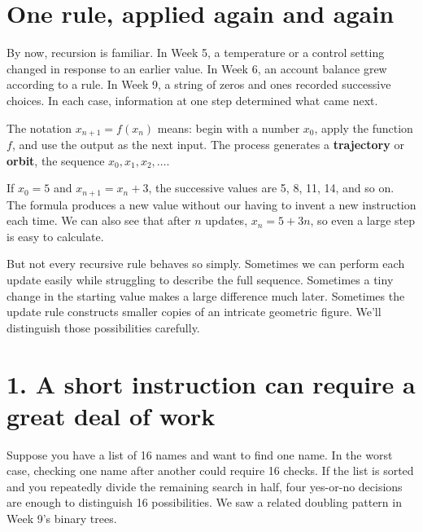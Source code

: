 \documentclass[11pt,letterpaper]{article}
\begin{document}
\section{One rule, applied again and again}


By now, recursion is familiar. In Week 5, a temperature or a control setting changed in response to an earlier value. In Week 6, an account balance grew according to a rule. In Week 9, a string of zeros and ones recorded successive choices. In each case, information at one step determined what came next.



The notation \(x_{n+1}=f(x_n)\) means: begin with a number \(x_0\), apply the function \(f\), and use the output as the next input. The process generates a \textbf{trajectory} or \textbf{orbit}, the sequence \(x_0,x_1,x_2,\ldots\).



\begin{tcolorbox}[title={A familiar example},breakable]

If \(x_0=5\) and \(x_{n+1}=x_n+3\), the successive values are 5, 8, 11, 14, and so on. The formula produces a new value without our having to invent a new instruction each time. We can also see that after \(n\) updates, \(x_n=5+3n\), so even a large step is easy to calculate.


\end{tcolorbox}


But not every recursive rule behaves so simply. Sometimes we can perform each update easily while struggling to describe the full sequence. Sometimes a tiny change in the starting value makes a large difference much later. Sometimes the update rule constructs smaller copies of an intricate geometric figure. We'll distinguish those possibilities carefully.



\clearpage


\section{1. A short instruction can require a great deal of work}


Suppose you have a list of 16 names and want to find one name. In the worst case, checking one name after another could require 16 checks. If the list is sorted and you repeatedly divide the remaining search in half, four yes-or-no decisions are enough to distinguish 16 possibilities. We saw a related doubling pattern in Week 9's binary trees.
\end{document}
